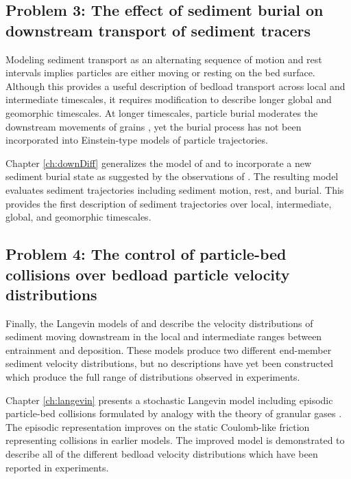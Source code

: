 \subsection{Problem 3: The effect of sediment burial on downstream transport of sediment tracers}

Modeling sediment transport as an alternating sequence of motion and rest intervals implies particles are either moving or resting on the bed surface. Although this provides a useful description of bedload transport across local and intermediate timescales, it requires modification to describe longer global and geomorphic timescales. 
At longer timescales, particle burial moderates the downstream movements of grains \citep{Hassan2017,Bradley2017}, yet the burial process has not been incorporated into Einstein-type models of particle trajectories. 

Chapter \ref{ch:downDiff} generalizes the model of \citet{Lisle1998} and \citet{Lajeunesse2017} to incorporate a new sediment burial state as suggested by the observations of \citet{Bradley2017}. The resulting model evaluates sediment trajectories including sediment motion, rest, and burial.
This provides the first description of sediment trajectories over local, intermediate, global, and geomorphic timescales.

\subsection{Problem 4: The control of particle-bed collisions over bedload particle velocity distributions}

Finally, the Langevin models of \citet{Fan2014} and \citet{Ancey2014} describe the velocity distributions of sediment moving downstream in the local and intermediate ranges between entrainment and deposition.
These models produce two different end-member sediment velocity distributions, but no descriptions have yet been constructed which produce the full range of distributions observed in experiments.

Chapter \ref{ch:langevin} presents a stochastic Langevin model including episodic particle-bed collisions formulated by analogy with the theory of granular gases \citep{Brilliantov2004}.
The episodic representation improves on the static Coulomb-like friction representing collisions in earlier models.
The improved model is demonstrated to describe all of the different bedload velocity distributions which have been reported in experiments.


